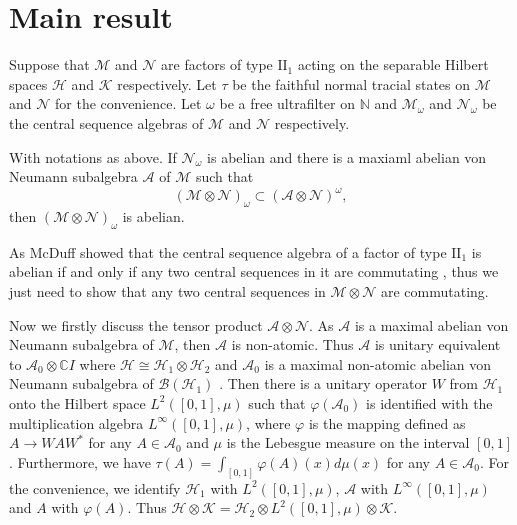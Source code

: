 \documentclass[12pt]{article}
\begin{document}
\section{Main result}

Suppose that $\mathcal{M}$ and $\mathcal{N}$ are factors of type
$\mathrm{II}_{1}$ acting on the separable Hilbert spaces
$\mathcal{H}$ and $\mathcal{K}$ respectively. Let $\tau$ be the
faithful normal tracial states on $\mathcal{M}$  and $\mathcal{N}$
for the convenience. Let $\omega$ be a free ultrafilter on
$\mathbb{N}$ and $\mathcal{M}_{\omega}$ and $\mathcal{N}_{\omega}$
be the central sequence algebras of $\mathcal{M}$ and $\mathcal{N}$
respectively. \vskip6pt

  With notations as above. If
$\mathcal{N}_{\omega}$ is abelian and there is a maxiaml abelian von
Neumann subalgebra $\mathcal{A}$ of $\mathcal{M}$ such that
$$(\mathcal{M}\otimes\mathcal{N})_{\omega}\subset(\mathcal{A}\otimes\mathcal{N})^{\omega},$$
then $(\mathcal{M}\otimes\mathcal{N})_{\omega}$ is abelian.

\vskip6pt As McDuff showed that the central sequence algebra of a
factor of type $\mathrm{II}_{1}$ is abelian if and only if any two
central sequences in it are commutating {\cite{[MD]}}, thus we just
need to show that any two central sequences in
$\mathcal{M}\otimes\mathcal{N}$ are commutating.

Now we firstly discuss the tensor product
$\mathcal{A}\otimes\mathcal{N}$. As $\mathcal{A}$ is a maximal
abelian von Neumann subalgebra of $\mathcal{M}$, then $\mathcal{A}$
is non-atomic. Thus $\mathcal{A}$ is unitary equivalent to
$\mathcal{A}_{0}\otimes\mathbb{C}I$ where
$\mathcal{H}\cong\mathcal{H}_{1}\otimes\mathcal{H}_{2}$ and
$\mathcal{A}_{0}$ is a maximal non-atomic abelian von Neumann
subalgebra of $\mathcal{B}(\mathcal{H}_{1})$ {\cite{[KR]}}. Then
there is a unitary operator $W$ from $\mathcal{H}_{1}$ onto the
Hilbert space $L^{2}([0,1],\mu)$ such that
$\varphi(\mathcal{A}_{0})$ is identified with the multiplication
algebra $L^{\infty}([0,1],\mu)$, where $\varphi$ is the mapping
defined as $A\rightarrow WAW^{*}$ for any $A\in\mathcal{A}_{0}$ and
$\mu$ is the Lebesgue measure on the interval $[0,1]$. Furthermore,
we have $\tau(A)=\int_{[0,1]}\varphi(A)(x)d\mu(x)$ for any
$A\in\mathcal{A}_{0}$. For the convenience, we identify
$\mathcal{H}_{1}$ with $L^{2}([0,1],\mu)$, $\mathcal{A}$ with
$L^{\infty}([0,1],\mu)$ and $A$ with $\varphi(A)$. Thus
$\mathcal{H}\otimes\mathcal{K}=\mathcal{H}_{2}\otimes
L^{2}([0,1],\mu)\otimes\mathcal{K}$.
\end{document}
